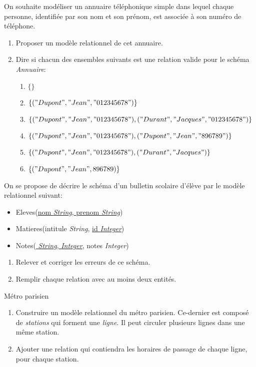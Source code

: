 \documentclass[a4paper,11pt]{article}
\begin{document}
\begin{Form}
\begin{exo}
On souhaite modéliser un annuaire téléphonique simple dans lequel chaque personne, identifiée par son nom et son prénom, est associée à son numéro de téléphone.
\begin{enumerate}
\item Proposer un modèle relationnel de cet annuaire.
\item Dire si chacun des ensembles suivants est une relation valide pour le schéma \emph{Annuaire}:
\begin{enumerate}
\item $\{\}$
\item $\{("Dupont","Jean","012345678")\}$
\item $\{("Dupont","Jean","012345678"), ("Durant","Jacques","012345678")\}$
\item $\{("Dupont","Jean","012345678"), ("Dupont","Jean","896789")\}$
\item $\{("Dupont","Jean","012345678"), ("Durant","Jacques")\}$
\item $\{("Dupont","Jean",896789)\}$
\end{enumerate}
\end{enumerate}
\end{exo}
\begin{exo}
On se propose de décrire le schéma d'un bulletin scolaire d'élève par le modèle relationnel suivant:
\begin{itemize}
\item Eleves(\underline{nom \emph{String}, prenom \emph{String}})
\item Matieres(intitule \emph{String}, \underline{id \emph{Integer}})
\item Notes(\underline{ \emph{String},  \emph{Integer}}, notes \emph{Integer})
\end{itemize}
\begin{enumerate}
\item Relever et corriger les erreurs de ce schéma.
\item Remplir chaque relation avec au moins deux entités.
\end{enumerate}
\end{exo}
\begin{exo}
Métro parisien
\begin{enumerate}
\item Construire un modèle relationnel du métro parisien. Ce-dernier est composé de \emph{stations} qui forment une \emph{ligne}. Il peut circuler plusieurs lignes dans une même station.
\item Ajouter une relation qui contiendra les horaires de passage de chaque ligne, pour chaque station.
\end{enumerate}

\end{exo}
\end{Form}
\end{document}

